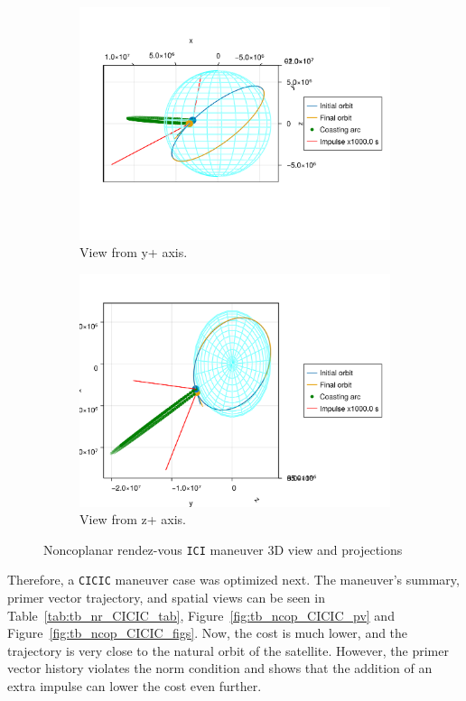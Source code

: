 \begin{figure}[htbp]
\begin{subfigure}{0.49\linewidth}
        \includegraphics[width=\linewidth]{../results/two_body/ipv_noncop/ICI_y+.png}
        \caption{View from y+ axis.}
    \end{subfigure}
    \begin{subfigure}{0.49\linewidth}
        \includegraphics[width=\linewidth]{../results/two_body/ipv_noncop/ICI_z+.png}
        \caption{View from z+ axis.}
    \end{subfigure}
    \caption{Noncoplanar rendez-vous \texttt{ICI} maneuver 3D view and projections}
    \label{fig:tb_ncop_ICI_figs}
\end{figure}

Therefore, a \texttt{CICIC} maneuver case was optimized next. The maneuver's summary, primer vector trajectory, and spatial views can be seen in Table~\ref{tab:tb_nr_CICIC_tab}, Figure~\ref{fig:tb_ncop_CICIC_pv} and Figure~\ref{fig:tb_ncop_CICIC_figs}. Now, the cost is much lower, and the trajectory is very close to the natural orbit of the satellite. However, the primer vector history violates the norm condition and shows that the addition of an extra impulse can lower the cost even further. 

